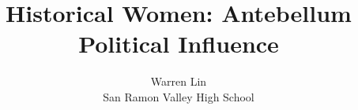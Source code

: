 \documentclass [12pt]{article}
\title{Historical Women: Antebellum Political Influence}
\author{Warren Lin \\San Ramon Valley High School}
\begin{document}
\maketitle
\nocite{*}


\end{document}
